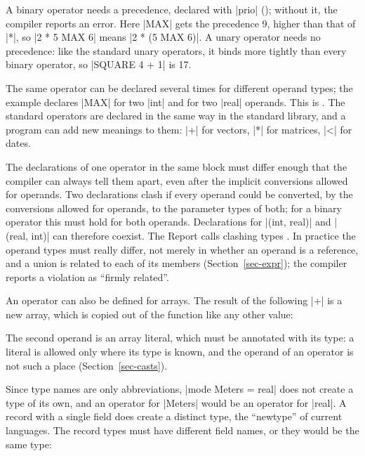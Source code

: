 
A binary operator needs a precedence, declared with \code|prio|
(); without it, the compiler reports an error.
Here \code|MAX| gets the precedence 9, higher than that of \code|*|, so
\code|2 * 5 MAX 6| means \code|2 * (5 MAX 6)|. A unary operator needs no
precedence: like the standard unary operators, it binds more tightly
than every binary operator, so \code|SQUARE 4 + 1| is 17.

The same operator can be declared several times for different operand
types; the example declares \code|MAX| for two \code|int| and for two
\code|real| operands. This is . The standard operators
are declared in the same way in the standard library, and a program can
add new meanings to them: \code|+| for vectors, \code|*| for matrices,
\code|<| for dates.

The declarations of one operator in the same block must differ enough
that the compiler can always tell them apart, even after the implicit
conversions allowed for operands. Two declarations clash if every
operand could be converted, by the conversions allowed for operands, to
the parameter types of both; for a binary operator this must hold for
both operands. Declarations for \code|(int, real)| and \code|(real, int)|
can therefore coexist. The Report calls clashing types . In practice the operand types must really differ, not merely
in whether an operand is a reference, and a union is related to each of
its members (Section~\ref{sec-expr}); the compiler reports a violation as
``firmly related''.

An operator can also be defined for arrays. The result of the following
\code|+| is a new array, which is copied out of the function like any
other value:


The second operand is an array literal, which must be annotated with its
type: a literal is allowed only where its type is known, and the operand
of an operator is not such a place (Section~\ref{sec-casts}).

Since type names are only abbreviations, \code|mode Meters = real| does
not create a type of its own, and an operator for \code|Meters| would be
an operator for \code|real|. A record with a single field does create a
distinct type, the ``newtype'' of current languages. The record types
must have different field names, or they would be the same type:


